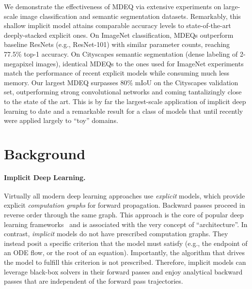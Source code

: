 \documentclass{article}
\begin{document}
We demonstrate the effectiveness of MDEQ via extensive experiments on large-scale image classification and semantic segmentation datasets. Remarkably, this shallow implicit model attains comparable accuracy levels to state-of-the-art deeply-stacked explicit ones.
On ImageNet classification, MDEQs outperform baseline ResNets (e.g., ResNet-101) with similar parameter counts, reaching 77.5\% top-1 accuracy.
On Cityscapes semantic segmentation (dense labeling of 2-megapixel images), identical MDEQs to the ones used for ImageNet experiments match the performance of recent explicit models while consuming much less memory. Our largest MDEQ surpasses 80\% mIoU on the Cityscapes validation set, outperforming strong convolutional networks and coming tantalizingly close to the state of the art. This is by far the largest-scale application of implicit deep learning to date and a remarkable result for a class of models that until recently were applied largely to ``toy'' domains.

\vspace{-.05in}
\section{Background}

\paragraph{Implicit Deep Learning.} Virtually all modern deep learning approaches use \emph{explicit} models, which provide explicit \emph{computation graphs} for forward propagation. Backward passes proceed in reverse order through the same graph. This approach is the core of popular deep learning frameworks~\cite{abadi2016tensorflow} and is associated with the very concept of ``architecture''.
In contrast, \emph{implicit} models do not have prescribed computation graphs. They instead posit a specific criterion that the model must satisfy (e.g., the endpoint of an ODE flow, or the root of an equation). Importantly, the algorithm that drives the model to fulfill this criterion is not prescribed. Therefore, implicit models can leverage black-box solvers in their forward passes and enjoy analytical backward passes that are independent of the forward pass trajectories.
\end{document}
